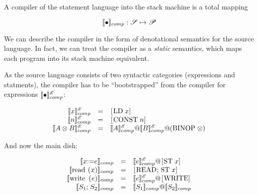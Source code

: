 A compiler of the statement language into the stack machine is a total mapping

\[
\llbracket{\bullet}\rrbracket_{comp} : \mathscr S \mapsto \mathscr P
\]

We can describe the compiler in the form of denotational semantics for the source language. In fact, we can treat the compiler as a \emph{static} semantics, which
maps each program into its stack machine equivalent.

As the source language consists of two syntactic categories (expressions and statments), the compiler has to be ``bootstrapped'' from the compiler for expressions
$\llbracket{\bullet}\rrbracket^{\mathscr E}_{comp}$:

\[
\begin{array}{rcl}
  \sembr{x}^{\mathscr E}_{comp}&=&\llang{[LD $\;x$]}\\
  \sembr{n}^{\mathscr E}_{comp}&=&\llang{[CONST $\;n$]}\\
  \sembr{A\otimes B}^{\mathscr E}_{comp}&=&\sembr{A}^{\mathscr E}_{comp}\llang{@}\sembr{B}^{\mathscr E}_{comp}\llang{@}(\llang{BINOP $\;\otimes$})
\end{array}
\]

And now the main dish:

\[
\begin{array}{rcl}
  \sembr{\llang{$x$ := $e$}}_{comp}&=&\sembr{e}^{\mathscr E}_{comp}\llang{@}\llang{[ST $\;x$]}\\
  \sembr{\llang{read ($x$)}}_{comp}&=&\llang{[READ; ST $\;x$]}\\
  \sembr{\llang{write ($e$)}}_{comp}&=&\sembr{e}^{\mathscr E}_{comp}\llang{@}\llang{[WRITE]}\\
  \sembr{\llang{$S_1$;$\;S_2$}}_{comp}&=&\sembr{S_1}_{comp}\llang{@}\sembr{S_2}_{comp}
\end{array}
\]
